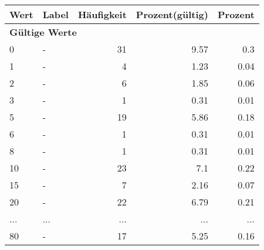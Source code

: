      \begin{longtable}{lXrrr}
     \toprule
     \textbf{Wert} & \textbf{Label} & \textbf{Häufigkeit} & \textbf{Prozent(gültig)} & \textbf{Prozent} \\
     \endhead
     \midrule
     \multicolumn{5}{l}{\textbf{Gültige Werte}}\\
        0 & \multicolumn{1}{X}{-} & %
          \num{31} &
          \num[round-mode=places,round-precision=2]{9.57} &
          \num[round-mode=places,round-precision=2]{0.3} \\
        1 & \multicolumn{1}{X}{-} & %
          \num{4} &
          \num[round-mode=places,round-precision=2]{1.23} &
          \num[round-mode=places,round-precision=2]{0.04} \\
        2 & \multicolumn{1}{X}{-} & %
          \num{6} &
          \num[round-mode=places,round-precision=2]{1.85} &
          \num[round-mode=places,round-precision=2]{0.06} \\
        3 & \multicolumn{1}{X}{-} & %
          \num{1} &
          \num[round-mode=places,round-precision=2]{0.31} &
          \num[round-mode=places,round-precision=2]{0.01} \\
        5 & \multicolumn{1}{X}{-} & %
          \num{19} &
          \num[round-mode=places,round-precision=2]{5.86} &
          \num[round-mode=places,round-precision=2]{0.18} \\
        6 & \multicolumn{1}{X}{-} & %
          \num{1} &
          \num[round-mode=places,round-precision=2]{0.31} &
          \num[round-mode=places,round-precision=2]{0.01} \\
        8 & \multicolumn{1}{X}{-} & %
          \num{1} &
          \num[round-mode=places,round-precision=2]{0.31} &
          \num[round-mode=places,round-precision=2]{0.01} \\
        10 & \multicolumn{1}{X}{-} & %
          \num{23} &
          \num[round-mode=places,round-precision=2]{7.1} &
          \num[round-mode=places,round-precision=2]{0.22} \\
        15 & \multicolumn{1}{X}{-} & %
          \num{7} &
          \num[round-mode=places,round-precision=2]{2.16} &
          \num[round-mode=places,round-precision=2]{0.07} \\
        20 & \multicolumn{1}{X}{-} & %
          \num{22} &
          \num[round-mode=places,round-precision=2]{6.79} &
          \num[round-mode=places,round-precision=2]{0.21} \\
       ... & ... & ... & ... & ... \\
        80 & \multicolumn{1}{X}{-} & %
          \num{17} &
          \num[round-mode=places,round-precision=2]{5.25} &
          \num[round-mode=places,round-precision=2]{0.16} \\


\end{longtable}

